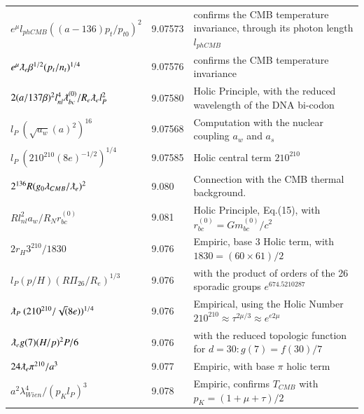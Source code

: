 \documentclass[a4paper,9pt]{article}
\begin{document}
\begin{table}
\begin{tabular}{lll}
 
 $ e^{\mu} l_{phCMB} ((a-136)p_t/p_{t0})^2$ & 9.07573 & confirms the CMB temperature invariance, through its photon length $l_{phCMB}$\\
 
 
 $ e^{\mu} \lambdabar_{e} \beta^{1/2} (p_t/n_t)^{1/4} $ & 9.07576 & confirms the CMB temperature invariance \\
 
 
 $ 2(a/137\beta)^2 l_{nl}^4 \lambdabar_{bc}^{(0)}/R_e \lambdabar_el_P^2 $ & 9.07580 & Holic Principle, with the reduced wavelength of the DNA bi-codon \\
 
 
 
 $ l_P ~ (\sqrt{a_w}(a)^2)^{16}  $ & 9.07568 & Computation with the nuclear coupling $a_w$ and $a_s$  \\
 
 $ l_P ~ (210^{210}(8e)^{-1/2})^{1/4}  $ & 9.07585 & Holic central term $210^{210}$  \\
 
 
 $ 2^{136}R(g_0\lambda_{CMB}/\lambdabar_e)^2  $ & 9.080 & Connection with the CMB thermal background.    \\
 
 $ Rl_{nl}^2a_w/R_Nr_{bc}^{(0)} $ & 9.081 & Holic Principle, Eq.(15), with $ r_{bc}^{(0)}= Gm_{bc}^{(0)}/c^2$    \\
 
 $ 2r_H 3^{210}/1830$& 9.076 & Empiric, base 3 Holic term, with $ 1830 = (60\times 61)/2 $   \\
  
  $l_P(p/H) (R \Pi_{26}/R_e)^{1/3} $ & 9.076 & with the product of orders of the 26 sporadic groups $e^{674.5210287}$ \cite{Sanchez2}  \\ 
  
   
   $  \lambdabar_P ~ (210^{210}/\sqrt(8e))^{1/4}$  & 9.076 & Empirical, using the Holic Number $210^{210}\approx \tau^{2\mu/3}\approx e^{e2\mu}$  \\
   
    
   $ \lambdabar_eg(7) (H/p)^2  P/6 $ & 9.076 & with the reduced topologic function for $d = 30: g(7) = f(30)/7$ \cite{Sanchez2}  \\
   
    
    $ 24 \lambdabar_e  \pi^{210}/a^3 $ & 9.077 & Empiric, with base $\pi$ holic term \\
    
    $ a^2 \lambda_{Wien}^4/(p_Kl_P)^3 $ & 9.078 & Empiric, confirms $T_{CMB}$ with $p_K = (1+\mu +\tau)/2$ \cite{Koide} \\


\end{tabular}
\end{table}
\end{document}
